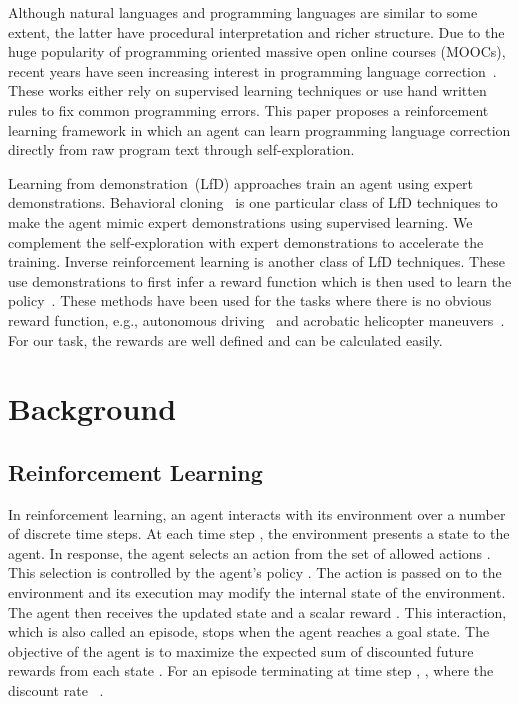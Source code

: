 \documentclass{article}
\begin{document}
Although natural languages and programming languages are similar to some extent,
the latter have procedural interpretation and richer structure.
Due to the huge popularity of programming oriented
massive open online courses (MOOCs),
recent years have seen increasing interest in programming language correction~\cite{gupta2017deepfix,parihar2017automatic}.
These works either rely on supervised learning techniques
or use hand written rules to fix common programming errors.
This paper proposes a reinforcement learning framework in which an agent
can learn programming language correction directly from raw program text through self-exploration.

Learning from demonstration~(LfD) approaches train an agent using expert demonstrations.
Behavioral cloning~\cite{DBLP:journals/jmlr/RossGB11} is one particular class of LfD techniques to make the agent mimic expert demonstrations using supervised learning.
We complement the self-exploration with expert demonstrations to accelerate the training.
Inverse reinforcement learning is another class of LfD techniques.
These use demonstrations to first infer a reward function which is then used to learn the policy~\cite{Abbeel:2004:ALV:1015330.1015430}.
These methods have been used for the tasks where there is no obvious reward function, e.g., autonomous driving~\cite{Abbeel:2004:ALV:1015330.1015430} and acrobatic helicopter maneuvers~\cite{abbeel2007application}.
For our task, the rewards are well defined and can be calculated easily.
 \section{Background}

\subsection{Reinforcement Learning}
In reinforcement learning, an agent interacts with its environment over a number of discrete time steps.
At each time step , the environment presents a state  to the agent. 
In response, the agent selects an action  from the set of allowed actions .
This selection is controlled by the agent's policy .
The action is passed on to the environment and its execution 
may modify the internal state of the environment. 
The agent then receives the updated state  and a scalar reward  . 
This interaction, which is also called an episode,  stops when the agent reaches a goal state.
The objective of the agent is to maximize the expected sum of discounted future rewards  from each state .
For an episode terminating at time step , , where the discount rate ~\cite{sutton1998reinforcement}.
\end{document}
